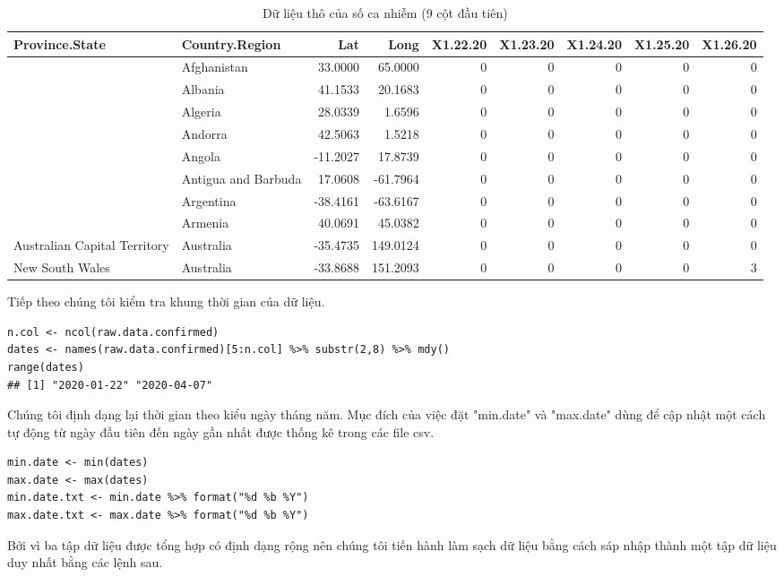\documentclass[12pt, a4paper,oneside]{book}
\theoremstyle{definition}
\begin{document}
\begin{table}[!h]	
	\caption{Dữ liệu thô của số ca nhiễm (9 cột đầu tiên)}
	\label{b23}
	\centering
	\fontsize{6}{8}\selectfont
	\begin{tabular}{llrrrrrrr}
		\toprule
		Province.State & Country.Region & Lat & Long & X1.22.20 & X1.23.20 & X1.24.20 & X1.25.20 & X1.26.20\\
		\midrule
		\rowcolor{gray!6}   & Afghanistan & 33.0000 & 65.0000 & 0 & 0 & 0 & 0 & 0\\
		& Albania & 41.1533 & 20.1683 & 0 & 0 & 0 & 0 & 0\\
		\rowcolor{gray!6}   & Algeria & 28.0339 & 1.6596 & 0 & 0 & 0 & 0 & 0\\
		& Andorra & 42.5063 & 1.5218 & 0 & 0 & 0 & 0 & 0\\
		\rowcolor{gray!6}   & Angola & -11.2027 & 17.8739 & 0 & 0 & 0 & 0 & 0\\
		\addlinespace
		& Antigua and Barbuda & 17.0608 & -61.7964 & 0 & 0 & 0 & 0 & 0\\
		\rowcolor{gray!6}   & Argentina & -38.4161 & -63.6167 & 0 & 0 & 0 & 0 & 0\\
		& Armenia & 40.0691 & 45.0382 & 0 & 0 & 0 & 0 & 0\\
		\rowcolor{gray!6}  Australian Capital Territory & Australia & -35.4735 & 149.0124 & 0 & 0 & 0 & 0 & 0\\
		New South Wales & Australia & -33.8688 & 151.2093 & 0 & 0 & 0 & 0 & 3\\
		\bottomrule
	\end{tabular}
\end{table}
Tiếp theo chúng tôi kiểm tra khung thời gian của dữ liệu.
\begin{lstlisting}
n.col <- ncol(raw.data.confirmed)
dates <- names(raw.data.confirmed)[5:n.col] %>% substr(2,8) %>% mdy()
range(dates)
## [1] "2020-01-22" "2020-04-07"
\end{lstlisting}
Chúng tôi định dạng lại thời gian theo kiểu ngày tháng năm. Mục đích của việc đặt "min.date" và "max.date" dùng để cập nhật một cách tự động từ ngày đầu tiên đến ngày gần nhất được thống kê trong các file csv.
\begin{lstlisting}
min.date <- min(dates)
max.date <- max(dates)
min.date.txt <- min.date %>% format("%d %b %Y")
max.date.txt <- max.date %>% format("%d %b %Y")
\end{lstlisting}
Bởi vì ba tập dữ liệu được tổng hợp có định dạng rộng nên chúng tôi tiến hành làm sạch dữ liệu bằng cách sáp nhập thành một tập dữ liệu duy nhất bằng các lệnh sau.
\end{document}
